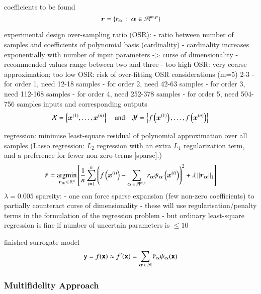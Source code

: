coefficients to be found
\begin{equation}
    \bm r = \left\{r_{\bm{\alpha}} \,:\, {\bm{\alpha}} \in \mathcal{A}^{m,p}\right\}
\end{equation}

experimental design
over-sampling ratio (OSR):
- ratio between number of samples and coefficients of polynomial basis (cardinality) \cite{palar_multi-fidelity_2016}
- cardinality increases exponentially with number of input parameters -> curse of dimensionality
- recommended values range between two and three \cite{hosder2007,palar_multi-fidelity_2016,fajraoui_optimal_2017,gratiet_metamodel-based_2015}
- too high OSR: very coarse approximation; too low OSR: risk of over-fitting \cite{palar_multi-fidelity_2016}
OSR considerations (m=5) 2-3
- for order 1, need 12-18 samples
- for order 2, need 42-63 samples
- for order 3, need 112-168 samples
- for order 4, need 252-378 samples
- for order 5, need 504-756 samples
inputs and corresponding outputs
\begin{equation}
    \mathcal{X} = \left\{ \bm x^{(1)},\dots,\bm x^{(n)} \right\} \quad\text{and}\quad 
    \mathcal{Y} = \left\{ f\left(\bm x^{(1)}\right),\dots,f\left(\bm x^{(n)}\right) \right\}
\end{equation}

regression: minimise least-square residual of polynomial approximation over all samples (Lasso regression: $L_2$ regression with an extra $L_1$ regularization term, and a preference for fewer non-zero terms [sparse].)
\begin{equation}
    \hat{\bm{r}} = \operatorname*{\arg\!\min}_{\bm{r}_{\bm{\alpha}} \,\in\, \mathbb{R}^q} \left[ \frac{1}{n} \sum_{i=1}^n \left(
        f\left(\bm x^{(i)}\right) - \sum_{{\bm{\alpha}} \,\in\, \mathcal{A}^{m,p}} r_{\bm{\alpha}} \psi_{\bm{\alpha}}\left(\bm x^{(i)}\right)
    \right)^2  + \lambda \left\lVert\bm{r}_{\bm{\alpha}}\right\rVert_1 \right]
\end{equation}
$\lambda=0.005$
sparsity:
- one can force sparse expansion (few non-zero coefficients) to partially counteract curse of dimensionality \cite{gratiet_metamodel-based_2015}
- these will use regularisation/penalty terms in the formulation of the regression problem
- but ordinary least-square regression is fine if number of uncertain parameters is $\leq 10$ \cite{gratiet_metamodel-based_2015}

finished surrogate model
\begin{equation}
    \mathsf{y} = f(\boldsymbol{\mathsf{x}}) \approx f'(\boldsymbol{\mathsf{x}}) = \sum_{{\bm{\alpha}} \,\in\, \mathcal{A}} \hat{r}_{\bm{\alpha}} \psi_{\bm{\alpha}} (\boldsymbol{\mathsf{x}})
\end{equation}

\subsubsection{Multifidelity Approach}
\label{sec:multifidelity}

